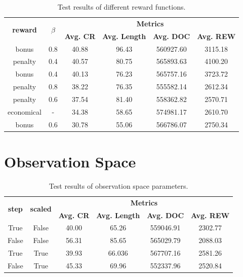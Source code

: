 \begin{table}[H]
	\centering
	\caption{Test results of different reward functions.}
	\begin{tabular}{cccccc}
		\toprule
		\multirow{2}{*}{\textbf{reward}} & \multirow{2}{*}{\textbf{$\beta$}} & \multicolumn{4}{c}{\textbf{Metrics}} \\ 
		\cmidrule(lr){3-6}
		&  & \textbf{Avg. CR} & \textbf{Avg. Length} & \textbf{Avg. DOC} & \textbf{Avg. REW} \\ 
		\midrule
		bonus & 0.8 & 40.88 & 96.43 & 560927.60 & 3115.18 \\
		penalty & 0.4 & 40.57 & 80.75 & 565893.63 & 4100.20 \\
		bonus & 0.4 & 40.13 & 76.23 & 565757.16 & 3723.72  \\
		penalty & 0.8 & 38.22 & 76.35 & 555582.14 & 2612.34 \\
		penalty & 0.6 & 37.54 & 81.40 & 558362.82 & 2570.71 \\
		economical & - & 34.38 & 58.65 & 574981.17 & 2610.70 \\
		bonus & 0.6 & 30.78 & 55.06 & 566786.07 & 2750.34 \\
		\bottomrule
	\end{tabular}
	\label{tab:test-reward2}
\end{table}

	
\section{Observation Space}

 \begin{table}[H]
	\centering
	\caption{Test results of observation space parameters.}
	\begin{tabular}{cccccc}
		\toprule
		\multirow{2}{*}{\textbf{step}} & \multirow{2}{*}{\textbf{scaled}} & \multicolumn{4}{c}{\textbf{Metrics}} \\ 
		\cmidrule(lr){3-6}
		& & \textbf{Avg. CR} & \textbf{Avg. Length} & \textbf{Avg. DOC} & \textbf{Avg. REW} \\ 
		\midrule
		
		True & False & 40.00 & 65.26 & 559046.91 & 2302.77 \\
		False & False  & 56.31 & 85.65 & 565029.79 & 2088.03 \\
		True & True & 39.93 & 66.036 & 567707.16  & 2581.26 \\
		False & True & 45.33 & 69.96 & 552337.96 & 2520.84 \\
		\bottomrule
	\end{tabular}
	\label{tab:test-obs2}
\end{table}

